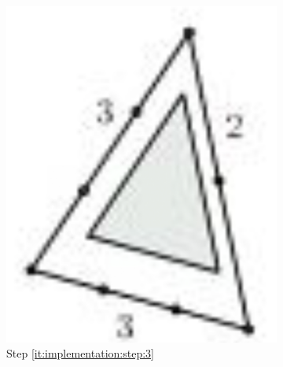 \begin{figure}
\begin{subfigure}{0.18\columnwidth}
		\includegraphics[width=\textwidth]{content/img/implementation/tessellation_3.png}
		\caption{Step \ref{it:implementation:step:3}}
		\label{fig:implementation:step:3}
	\end{subfigure}		
			\begin{subfigure}{0.18\columnwidth}
		\centering

\end{subfigure}
\end{figure}

